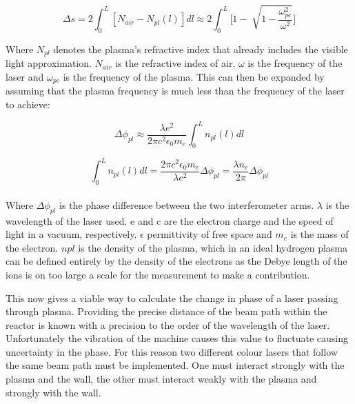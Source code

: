 \documentclass[12pt,a4paper,oneside]{report}
\begin{document}
\begin{equation}
	\Delta s = 2 \int_{0}^{L} [N_{air} - N_{pl}(l)]dl \approx 2 \int_{0}^{L} \Bigg[1 - \sqrt[]{1-\frac{\omega_{pe}^{2}}{\omega^{2}}}\Bigg]
	\label{opticalpathint}
\end{equation}

Where $N_{pl}$ denotes the plasma's refractive index that already includes the visible light approximation. $N_{air}$ is the refractive index of air. $\omega$ is the frequency of the laser and $\omega_{pe}$ is the frequency of the plasma. This can then be expanded by assuming that the plasma frequency is much less than the frequency of the laser to achieve:

\begin{equation}
	\Delta\phi_{pl} \approx \frac{\lambda e^{2}}{2 \pi c^{2} \epsilon_{0} m_{e}} \int_{0}^{L} n_{pl} (l) dl
	\label{phase}
\end{equation}

\begin{equation}
	\int_{0}^{L} n_{pl} (l) dl = \frac{2 \pi c^{2} \epsilon_{0} m_{e}}{\lambda e^{2}} \Delta\phi_{pl} = \frac{\lambda n_{c}}{2 \pi} \Delta\phi_{pl}
	\label{phaseintegral}
\end{equation}
\\
Where $\Delta\phi_{pl}$ is the phase difference between the two interferometer arms. $\lambda$ is the wavelength of the laser used. e and c are the electron charge and the speed of light in a vacuum, respectively. $\epsilon$ permittivity of free space and $m_{e}$ is the mass of the electron. $n{pl}$ is the density of the plasma, which in an ideal hydrogen plasma can be defined entirely by the density of the electrons as the Debye length of the ions is on too large a scale for the measurement to make a contribution. 

This now gives a viable way to calculate the change in phase of a laser passing through plasma. Providing the precise distance of the beam path within the reactor is known with a precision to the order of the wavelength of the laser. Unfortunately the vibration of the machine causes this value to fluctuate causing uncertainty in the phase. For this reason two different colour lasers that follow the same beam path must be implemented. One must interact strongly with the plasma and the wall, the other must interact weakly with the plasma and strongly with the wall.
\end{document}
